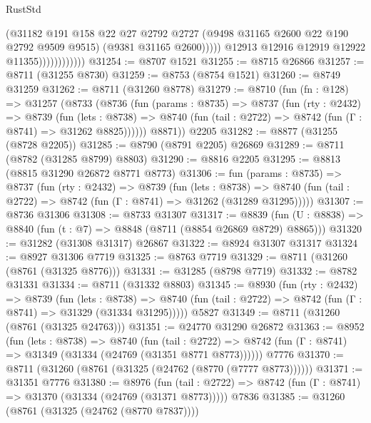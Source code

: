 \begin{lexlean}{RustStd}
\begin{coremodule}
                                  (@31182
                                    @191
                                    @158
                                    @22
                                    @27
                                    @2792
                                    @2727
                                    (@9498 @31165 @2600 @22 @190 @2792 @9509 @9515)
                                    (@9381 @31165 @2600)))))
                            @12913
                            @12916
                            @12919
                            @12922
                            @11355))))))))))))
@31254 := @8707 @1521
@31255 := @8715 @26866
@31257 := @8711 (@31255 @8730)
@31259 := @8753 (@8754 @1521)
@31260 := @8749 @31259
@31262 := @8711 (@31260 @8778)
@31279 := @8710
    (fun (fn : @128) =>
    @31257
      (@8733
        (@8736
          (fun (params : @8735) =>
          @8737
            (fun (rty : @2432) =>
            @8739
              (fun (lets : @8738) =>
              @8740 (fun (tail : @2722) => @8742 (fun (Γ : @8741) => @31262 @8825))))))
        @8871))
    @2205
@31282 := @8877 (@31255 (@8728 @2205))
@31285 := @8790 (@8791 @2205) @26869
@31289 := @8711 (@8782 (@31285 @8799) @8803)
@31290 := @8816 @2205
@31295 := @8813 (@8815 @31290 @26872 @8771 @8773)
@31306 := fun (params : @8735) =>
  @8737
    (fun (rty : @2432) =>
    @8739
      (fun (lets : @8738) =>
      @8740 (fun (tail : @2722) => @8742 (fun (Γ : @8741) => @31262 (@31289 @31295)))))
@31307 := @8736 @31306
@31308 := @8733 @31307
@31317 := @8839
    (fun (U : @8838) => @8840 (fun (t : @7) => @8848 (@8711 (@8854 @26869 @8729) @8865)))
@31320 := @31282 (@31308 @31317) @26867
@31322 := @8924 @31307 @31317
@31324 := @8927 @31306 @7719
@31325 := @8763 @7719
@31329 := @8711 (@31260 (@8761 (@31325 @8776)))
@31331 := @31285 (@8798 @7719)
@31332 := @8782 @31331
@31334 := @8711 (@31332 @8803)
@31345 := @8930
    (fun (rty : @2432) =>
    @8739
      (fun (lets : @8738) =>
      @8740 (fun (tail : @2722) => @8742 (fun (Γ : @8741) => @31329 (@31334 @31295)))))
    @5827
@31349 := @8711 (@31260 (@8761 (@31325 @24763)))
@31351 := @24770 @31290 @26872
@31363 := @8952
    (fun (lets : @8738) =>
    @8740
      (fun (tail : @2722) =>
      @8742 (fun (Γ : @8741) => @31349 (@31334 (@24769 (@31351 @8771 @8773))))))
    @7776
@31370 := @8711 (@31260 (@8761 (@31325 (@24762 (@8770 (@7777 @8773))))))
@31371 := @31351 @7776
@31380 := @8976
    (fun (tail : @2722) => @8742 (fun (Γ : @8741) => @31370 (@31334 (@24769 (@31371 @8773)))))
    @7836
@31385 := @31260 (@8761 (@31325 (@24762 (@8770 @7837))))

\end{coremodule}
\end{lexlean}
